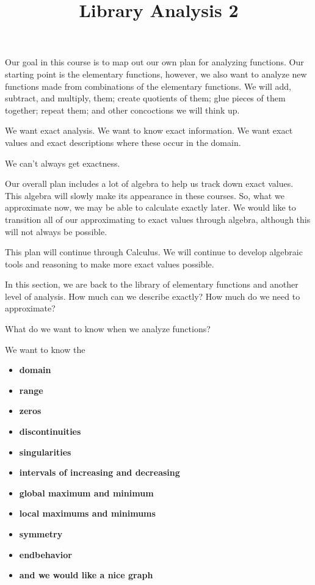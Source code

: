 \documentclass{ximera}
\title{Library Analysis 2}
\begin{document}
\begin{abstract}
\end{abstract}
\maketitle


Our goal in this course is to map out our own plan for analyzing functions.  Our starting point is the elementary functions, however, we also want to analyze new functions made from combinations of the elementary functions.  We will add, subtract, and multiply, them; create quotients of them; glue pieces of them together; repeat them; and other concoctions we will think up.

We want exact analysis.  We want to know exact information.  We want exact values and exact descriptions where these occur in the domain.

We can't always get exactness. 

Our overall plan includes a lot of algebra to help us track down exact values.  This algebra will slowly make its appearance in these courses.  So, what we approximate now, we may be able to calculate exactly later.  We would like to transition all of our approximating to exact values through algebra, although this will not always be possible.

This plan will continue through Calculus.  We will continue to develop algebraic tools and reasoning to make more exact values possible.

In this section, we are back to the library of elementary functions and another level of analysis.  How much can we describe exactly? How much do we need to approximate?



What do we want to know when we analyze functions?

We want to know the 
\begin{itemize}
\item \textbf{\textcolor{red!80!black}{domain}} 
\item \textbf{\textcolor{red!80!black}{range}} 
\item \textbf{\textcolor{red!80!black}{zeros}} 
\item \textbf{\textcolor{red!80!black}{discontinuities}} 
\item \textbf{\textcolor{red!80!black}{singularities}} 
\item \textbf{\textcolor{red!80!black}{intervals of increasing and decreasing}} 
\item \textbf{\textcolor{red!80!black}{global maximum and minimum}} 
\item \textbf{\textcolor{red!80!black}{local maximums and minimums}} 
\item \textbf{\textcolor{red!80!black}{symmetry}} 
\item \textbf{\textcolor{red!80!black}{endbehavior}}  \\
\item \textbf{\textcolor{purple!85!blue}{and we would like a nice graph}} 
\end{itemize}
\end{document}
